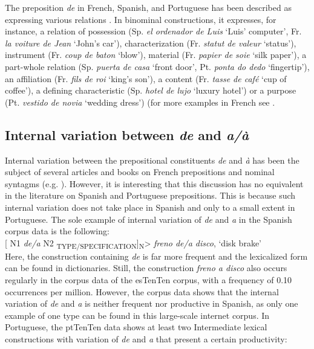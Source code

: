 \documentclass[output=paper]{langsci/langscibook}
\begin{document}
The preposition \textit{de} in French, Spanish, and Portuguese has been described as expressing various relations \citep[187]{Bartning:1993}. In binominal constructions, it expresses, for instance, a relation of possession (Sp. \textit{el ordenador de Luis} `Luis' computer', Fr. \textit{la voiture de Jean} `John’s car'), characterization (Fr. \textit{statut de valeur} `status'), instrument (Fr. \textit{coup de baton} `blow'), material (Fr. \textit{papier de soie} `silk paper'), a part-whole relation (Sp. \textit{puerta de casa} `front door', Pt. \textit{ponta do dedo} `fingertip'), an affiliation (Fr. \textit{fils de roi} ‘king’s son’), a content (Fr. \textit{tasse de café} `cup of coffee'), a defining characteristic (Sp. \textit{hotel de lujo} `luxury hotel') or a purpose (Pt. \textit{vestido de novia} `wedding dress') (for more examples in French see \citep[291 ff.]{Lang:1991}.

\subsection{Internal variation between \textit{de} and \textit{a/à}}

Internal variation between the prepositional constituents \textit{de} and \textit{à} has been the subject of several articles and books on French prepositions and nominal syntagms (e.g. \citealt{Anscombre:1990, Lang:1991, Bosredon:1991, Cadiot:1997}). However, it is interesting that this discussion has no equivalent in the literature on Spanish and Portuguese prepositions. This is because such internal variation does not take place in Spanish and only to a small extent in Portuguese. The sole example of internal variation of \textit{de} and \textit{a} in the Spanish corpus data is the following:\\

[ N1 \textit{de/a} N2 \textsubscript{TYPE/SPECIFICATION}]\textsubscript{N}>		\textit{freno de/a disco},	`disk brake'\\

Here, the construction containing \textit{de} is far more frequent and the lexicalized form can be found in dictionaries. Still, the construction \textit{freno a disco} also occurs regularly in the corpus data of the esTenTen corpus, with a frequency of 0.10 occurrences per million. However, the corpus data shows that the internal variation of \textit{de} and \textit{a} is neither frequent nor productive in Spanish, as only one example of one type can be found in this large-scale internet corpus. In Portuguese, the ptTenTen data shows at least two Intermediate lexical constructions with variation of \textit{de} and \textit{a} that present a certain productivity:\\ 
\end{document}
